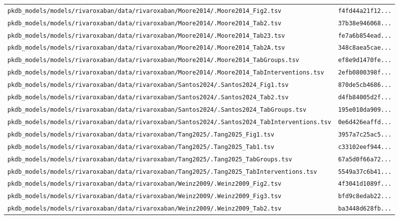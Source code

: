 \begin{longtable}{ll}
\texttt{pkdb\_models/models/rivaroxaban/data/rivaroxaban/Moore2014/.Moore2014\_Fig2.tsv} & \texttt{f4fd44a21f12...} \\
\texttt{pkdb\_models/models/rivaroxaban/data/rivaroxaban/Moore2014/.Moore2014\_Tab2.tsv} & \texttt{37b38e946068...} \\
\texttt{pkdb\_models/models/rivaroxaban/data/rivaroxaban/Moore2014/.Moore2014\_Tab23.tsv} & \texttt{fe7a6b854ead...} \\
\texttt{pkdb\_models/models/rivaroxaban/data/rivaroxaban/Moore2014/.Moore2014\_Tab2A.tsv} & \texttt{348c8aea5cae...} \\
\texttt{pkdb\_models/models/rivaroxaban/data/rivaroxaban/Moore2014/.Moore2014\_TabGroups.tsv} & \texttt{ef8e9d1470fe...} \\
\texttt{pkdb\_models/models/rivaroxaban/data/rivaroxaban/Moore2014/.Moore2014\_TabInterventions.tsv} & \texttt{2efb0800398f...} \\
\texttt{pkdb\_models/models/rivaroxaban/data/rivaroxaban/Santos2024/.Santos2024\_Fig1.tsv} & \texttt{870de5cb4686...} \\
\texttt{pkdb\_models/models/rivaroxaban/data/rivaroxaban/Santos2024/.Santos2024\_Tab2.tsv} & \texttt{d4fb84005d2f...} \\
\texttt{pkdb\_models/models/rivaroxaban/data/rivaroxaban/Santos2024/.Santos2024\_TabGroups.tsv} & \texttt{195e010da909...} \\
\texttt{pkdb\_models/models/rivaroxaban/data/rivaroxaban/Santos2024/.Santos2024\_TabInterventions.tsv} & \texttt{0e6d426eaffd...} \\
\texttt{pkdb\_models/models/rivaroxaban/data/rivaroxaban/Tang2025/.Tang2025\_Fig1.tsv} & \texttt{3957a7c25ac5...} \\
\texttt{pkdb\_models/models/rivaroxaban/data/rivaroxaban/Tang2025/.Tang2025\_Tab1.tsv} & \texttt{c33102eef944...} \\
\texttt{pkdb\_models/models/rivaroxaban/data/rivaroxaban/Tang2025/.Tang2025\_TabGroups.tsv} & \texttt{67a5d0f66a72...} \\
\texttt{pkdb\_models/models/rivaroxaban/data/rivaroxaban/Tang2025/.Tang2025\_TabInterventions.tsv} & \texttt{5549a37c6b41...} \\
\texttt{pkdb\_models/models/rivaroxaban/data/rivaroxaban/Weinz2009/.Weinz2009\_Fig2.tsv} & \texttt{4f3041d1089f...} \\
\texttt{pkdb\_models/models/rivaroxaban/data/rivaroxaban/Weinz2009/.Weinz2009\_Fig3.tsv} & \texttt{bfd9c8edab22...} \\
\texttt{pkdb\_models/models/rivaroxaban/data/rivaroxaban/Weinz2009/.Weinz2009\_Tab2.tsv} & \texttt{ba3448d628fb...} \\

\end{longtable}
